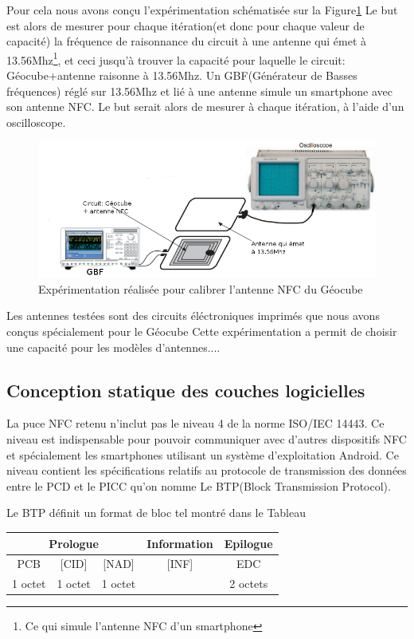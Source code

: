 \documentclass{themeensg}
\begin{document}
Pour cela nous avons conçu l'expérimentation schématisée sur la Figure\ref{experience} Le but est alors de mesurer pour chaque itération(et donc pour chaque valeur de capacité) la fréquence de raisonnance du circuit à une antenne qui émet à 13.56Mhz\footnote{Ce qui simule l'antenne NFC d'un smartphone}, et ceci jusqu'à trouver la capacité pour laquelle le circuit: Géocube+antenne raisonne à 13.56Mhz. Un GBF(Générateur de Basses fréquences) réglé sur 13.56Mhz et lié à une antenne simule un smartphone avec son antenne NFC. Le but serait alors de mesurer à chaque itération, à l'aide d'un oscilloscope.

\begin{figure}[h!]
\centering
\label{experience}
\includegraphics[scale=0.55]{images/gbfoscillo.png}
\caption{Expérimentation réalisée pour calibrer l'antenne NFC du Géocube}
\end{figure}
Les antennes testées sont des circuits éléctroniques imprimés que nous avons conçus spécialement pour le Géocube
Cette expérimentation a permit de choisir une capacité pour les modèles d'antennes....

\subsection{Conception statique des couches logicielles}
La puce NFC retenu n'inclut pas le niveau 4 de la norme ISO/IEC 14443. Ce niveau est indispensable pour pouvoir communiquer avec d'autres dispositifs NFC et spécialement les smartphones utilisant un système d'exploitation Android. Ce niveau contient les spécifications relatifs au protocole de transmission des données entre le PCD et le PICC qu'on nomme Le BTP(Block Transmission Protocol).

Le BTP définit un format de bloc tel montré dans le Tableau

\begin{tabular}[hf]{|c|c|c|c|c|c|c|c|}
\hline
\multicolumn{3}{|c|}{Prologue} & \multicolumn{3}{c|}{Information} & \multicolumn{2}{c|}{Epilogue} \\
\hline
PCB & [CID] & [NAD] & \multicolumn{3}{|c|}{[INF]} & \multicolumn{2}{c|}{EDC}\\
\hline
1 octet & 1 octet & 1 octet & \multicolumn{3}{|c|}{} & \multicolumn{2}{c|}{2 octets}\\
\hline
\end{tabular}
\end{document}
